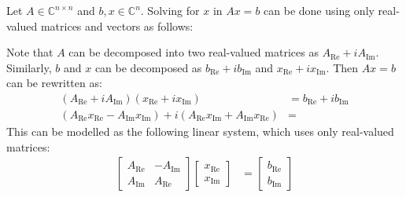 \documentclass{article}
\begin{document}
\clearpage

\problem{}
Let $A \in \mathbb{C}^{n\times n}$ and $b, x \in \mathbb{C}^n$. Solving for $x$ in $Ax = b$ can be done using only real-valued matrices and vectors as follows:

Note that $A$ can be decomposed into two real-valued matrices as $A_{\textrm{Re}} + iA_{\textrm{Im}}$. Similarly, $b$ and $x$ can be decomposed as $b_{\textrm{Re}} + ib_{\textrm{Im}}$ and $x_{\textrm{Re}} + ix_{\textrm{Im}}$. Then $Ax = b$ can be rewritten as:
\begin{align*}
    (A_{\textrm{Re}} + iA_{\textrm{Im}})(x_{\textrm{Re}} + ix_{\textrm{Im}}) & = b_{\textrm{Re}} + ib_{\textrm{Im}} \\
    (A_{\textrm{Re}}x_{\textrm{Re}} - A_{\textrm{Im}}x_{\textrm{Im}}) + i(A_{\textrm{Re}}x_{\textrm{Im}} + A_{\textrm{Im}}x_{\textrm{Re}}) & = 
\end{align*}
This can be modelled as the following linear system, which uses only real-valued matrices:
\begin{align*}
    \begin{bmatrix}
        A_{\textrm{Re}} & -A_{\textrm{Im}} \\
        A_{\textrm{Im}} & A_{\textrm{Re}}
    \end{bmatrix}
    \begin{bmatrix}
        x_{\textrm{Re}} \\ x_{\textrm{Im}}
    \end{bmatrix}
    & = 
    \begin{bmatrix}
        b_{\textrm{Re}} \\ b_{\textrm{Im}}
    \end{bmatrix}
\end{align*}

\clearpage
\end{document}
